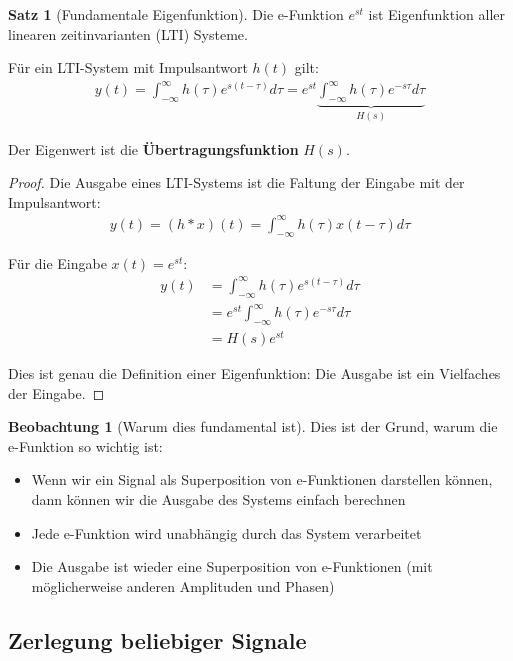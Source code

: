 ﻿\documentclass[a4paper,12pt]{report}
\theoremstyle{definition}
\newtheorem{satz}{Satz}
\newtheorem{beobachtung}{Beobachtung}
\begin{document}
	\begin{satz}[Fundamentale Eigenfunktion]
		Die e-Funktion $e^{st}$ ist Eigenfunktion aller linearen zeitinvarianten (LTI) Systeme.
		
		Für ein LTI-System mit Impulsantwort $h(t)$ gilt:
		\begin{align}
			y(t) = \int_{-\infty}^{\infty} h(\tau) e^{s(t-\tau)} d\tau = e^{st} \underbrace{\int_{-\infty}^{\infty} h(\tau) e^{-s\tau} d\tau}_{H(s)}
		\end{align}
		
		Der Eigenwert ist die \textbf{Übertragungsfunktion} $H(s)$.
	\end{satz}
	
	\begin{proof}
		Die Ausgabe eines LTI-Systems ist die Faltung der Eingabe mit der Impulsantwort:
		\begin{align}
			y(t) = (h * x)(t) = \int_{-\infty}^{\infty} h(\tau) x(t-\tau) d\tau
		\end{align}
		
		Für die Eingabe $x(t) = e^{st}$:
		\begin{align}
			y(t) &= \int_{-\infty}^{\infty} h(\tau) e^{s(t-\tau)} d\tau \\
			&= e^{st} \int_{-\infty}^{\infty} h(\tau) e^{-s\tau} d\tau \\
			&= H(s) e^{st}
		\end{align}
		
		Dies ist genau die Definition einer Eigenfunktion: Die Ausgabe ist ein Vielfaches der Eingabe.
	\end{proof}
	
	\begin{beobachtung}[Warum dies fundamental ist]
		Dies ist der Grund, warum die e-Funktion so wichtig ist:
		\begin{itemize}
			\item[-] Wenn wir ein Signal als Superposition von e-Funktionen darstellen können, dann können wir die Ausgabe des Systems einfach berechnen
			\item[-] Jede e-Funktion wird unabhängig durch das System verarbeitet
			\item[-] Die Ausgabe ist wieder eine Superposition von e-Funktionen (mit möglicher\-weise anderen Amplituden und Phasen)
		\end{itemize}
	\end{beobachtung}
	
	\subsection{Zerlegung beliebiger Signale}
	
\end{document}
